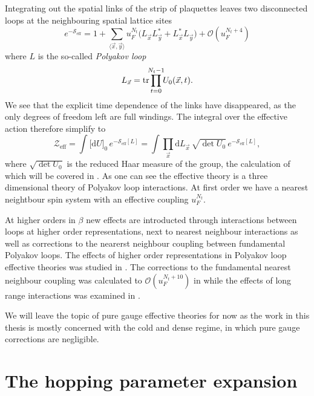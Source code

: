 Integrating out the spatial links of the strip of plaquettes leaves two
disconnected loops at the neighbouring spatial lattice sites
%
\begin{equation}
  e^{-\mathcal{S}_{\text{eff}}} = 1 + \sum_{\langle \vec{x}, \vec{y} \rangle} u_F^{N_t}
  \big( L_{\vec{x}} L^*_{\vec{y}} + L^*_{\vec{x}} L_{\vec{y}} \big) + \mathcal{O}(u_F^{N_t+4})
\end{equation}
%
where $L$ is the so-called \emph{Polyakov loop}
%
\begin{equation}
  L_{\vec{x}} = \tr \prod_{\mathclap{t=0}}^{\mathclap{N_t-1}} U_0(\vec{x},t) .
\end{equation}
%
We see that the explicit time dependence of the links have disappeared, as the
only degrees of freedom left are full windings. The integral over the effective
action therefore simplify to
%
\begin{equation}
  \mathcal{Z}_{\text{eff}} = \int \big[\mathrm{d} U\big]_0 \,
    e^{-\mathcal{S}_{\text{eff}}[L]} 
  = \int \prod_{\vec{x}} \mathrm{d} L_{\vec{x}} \, \sqrt{\det U_0} \,
    e^{-\mathcal{S}_{\text{eff}}[L]} ,
\end{equation}
%
where $\sqrt{\det U_0}$ is the reduced Haar measure of the group, the calculation of
which will be covered in . As one can see the effective
theory is a three dimensional theory of Polyakov loop interactions. At first
order we have a nearest neightbour spin system with an effective coupling
$u_F^{N_t}$.

At higher orders in $\beta$ new effects are introducted through interactions
between loops at higher order representations, next to nearest neighbour
interactions as well as corrections to the nearerst neighbour coupling between
fundamental Polyakov loops. The effects of higher order representations in
Polyakov loop effective theories was studied in \citep{Wozar:2007tz}. The
corrections to the fundamental nearest neighbour coupling was calculated to 
$\mathcal{O}(u_F^{N_t + 10})$ in \citep{Langelage:2010yr} while the effects of
long range interactions was examined in \citep{Bergner:2015rza}.

We will leave the topic of pure gauge effective theories for now as the work in
this thesis is mostly concerned with the cold and dense regime, in which pure
gauge corrections are negligible.

\section{The hopping parameter expansion}

